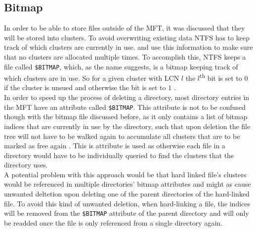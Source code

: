 \subsection{Bitmap}
In order to be able to store files outside of the MFT, it was discussed that they will be stored into clusters. To avoid overwriting existing data NTFS has to keep track of which clusters are currently in use. and use this information to make sure that no clusters are allocated multiple times. To accomplish this, NTFS keeps a file called \texttt{\$BITMAP}, which, as the name suggests, is a bitmap keeping track of which clusters are in use. So for a given cluster with LCN $l$ the $l$\textsuperscript{th} bit is set to $0$ if the cluster is unsued and otherwise the bit is set to $1$ \cite{B:2017:AJI1}.\\
 In order to speed up the process of deleting a directory, most directory entries in the MFT have an attribute called \texttt{\$BITMAP}. This attribute is not to be confused though with the bitmap file discussed before, as it only contains a list of bitmap indices that are currently in use by the directory, such that upon deletion the file tree will not have to be walked again to accumulate  all clusters that are  to be marked as free again \cite{RUSSINOVICH_ET_AL:2012:WI}. This is attribute is used as otherwise each file in a directory would have to be individually queried to find the clusters that the directory uses.\\
 A potential problem with this approach would be that hard linked file's clusters would be referenced in multiple directories' bitmap attributes and might as cause unwanted deltetion upon deleting one of the parent directories of the hard-linked file. To avoid this kind of unwanted deletion, when hard-linking a file, the indices will be removed from the \texttt{\$BITMAP} attribute of the parent directory and will only be readded once the file is only referenced from a single directory again.